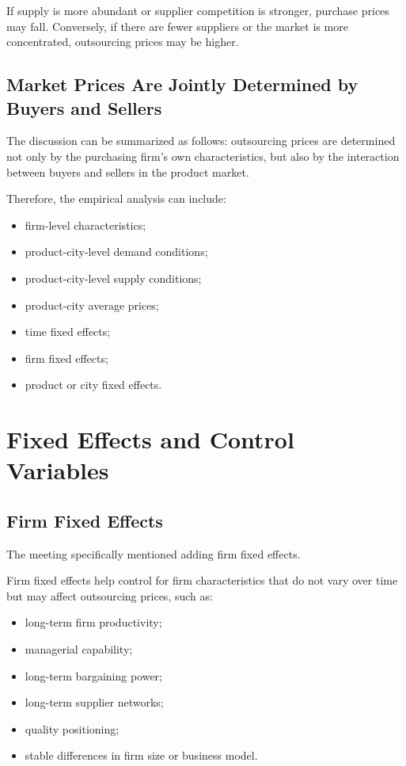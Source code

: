 \documentclass[11pt,a4paper]{article}
\begin{document}
If supply is more abundant or supplier competition is stronger, purchase prices may fall. Conversely, if there are fewer suppliers or the market is more concentrated, outsourcing prices may be higher.

\subsection{Market Prices Are Jointly Determined by Buyers and Sellers}

The discussion can be summarized as follows: outsourcing prices are determined not only by the purchasing firm's own characteristics, but also by the interaction between buyers and sellers in the product market.

Therefore, the empirical analysis can include:

\begin{itemize}
    \item firm-level characteristics;
    \item product-city-level demand conditions;
    \item product-city-level supply conditions;
    \item product-city average prices;
    \item time fixed effects;
    \item firm fixed effects;
    \item product or city fixed effects.
\end{itemize}

\section{Fixed Effects and Control Variables}

\subsection{Firm Fixed Effects}

The meeting specifically mentioned adding firm fixed effects.

Firm fixed effects help control for firm characteristics that do not vary over time but may affect outsourcing prices, such as:

\begin{itemize}
    \item long-term firm productivity;
    \item managerial capability;
    \item long-term bargaining power;
    \item long-term supplier networks;
    \item quality positioning;
    \item stable differences in firm size or business model.
\end{itemize}
\end{document}
